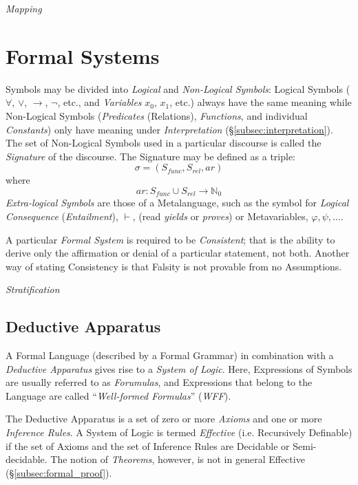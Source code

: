 \documentclass{article}
\begin{document}
\emph{Mapping} %

\section{Formal Systems}\label{sec:formal_systems}

Symbols may be divided into \emph{Logical} and \emph{Non-Logical
  Symbols}: Logical Symbols ($\forall$, $\vee$, $\rightarrow$, $\neg$,
etc., and \emph{Variables} $x_0$, $x_1$, etc.) always have the same
meaning while Non-Logical Symbols (\emph{Predicates} (Relations),
\emph{Functions}, and individual \emph{Constants}) only have meaning
under \emph{Interpretation} (\S\ref{subsec:interpretation}). The set of
Non-Logical Symbols used in a particular discourse is called the
\emph{Signature} of the discourse. The Signature may be defined as a
triple:
\[
    \sigma = (S_{func},S_{rel},ar)
\]
where
\[
    ar: S_{func} \cup S_{rel} \rightarrow \mathbb{N}_0
\]
\emph{Extra-logical Symbols} are those of a Metalanguage, such as the
symbol for \emph{Logical Consequence} (\emph{Entailment}), $\vdash$,
(read \emph{yields} or \emph{proves}) or Metavariables, $\varphi,
\psi, \ldots$.

A particular \emph{Formal System} is required to be \emph{Consistent}; that
is the ability to derive only the affirmation or denial of a
particular statement, not both. Another way of stating Consistency is
that Falsity is not provable from no Assumptions.

\emph{Stratification}

\subsection{Deductive Apparatus} \label{subsec:deductive_apparatus}

A Formal Language (described by a Formal Grammar) in combination with
a \emph{Deductive Apparatus} gives rise to a \emph{System of
  Logic}. Here, Expressions of Symbols are usually referred to as
\emph{Forumulas}, and Expressions that belong to the Language are
called ``\emph{Well-formed Formulas}'' (\emph{WFF}).

The Deductive Apparatus is a set of zero or more \emph{Axioms} and one
or more \emph{Inference Rules}. A System of Logic is termed
\emph{Effective} (i.e. Recursively Definable) if the set of Axioms and
the set of Inference Rules are Decidable or Semi-decidable. The notion
of \emph{Theorems}, however, is not in general Effective
(\S\ref{subsec:formal_proof}).
\end{document}
